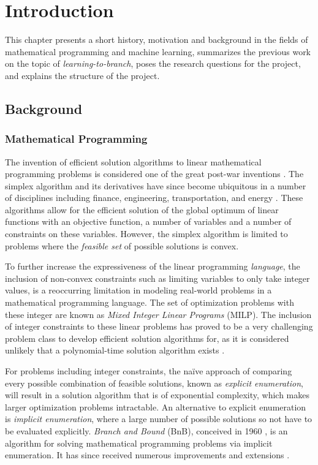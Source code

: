 \chapter{Introduction}\label{cha:introduction}
%
This chapter presents a short history, motivation and background in the fields of mathematical programming and machine learning, summarizes the previous work on the topic of \textit{learning-to-branch}, poses the research questions for the project, and explains the structure of the project.


\section{Background}


\subsection{Mathematical Programming}

The invention of efficient solution algorithms to linear mathematical programming problems is considered one of the great post-war inventions \cite{dantzig1983reminiscences}. The simplex algorithm and its derivatives have since become ubiquitous in a number of disciplines including finance, engineering, transportation, and energy \cite{junger2010years}. These algorithms allow for the efficient solution of the global optimum of linear functions with an objective function, a number of variables and a number of constraints on these variables. However, the simplex algorithm is limited to problems where the \textit{feasible set} of possible solutions is convex.

To further increase the expressiveness of the linear programming \textit{language}, the inclusion of non-convex constraints such as limiting variables to only take integer values, is a reoccurring limitation in modeling real-world problems in a mathematical programming language. The set of optimization problems with these integer are known as \textit{Mixed Integer Linear Programs} (\gls{MILP}). The inclusion of integer constraints to these linear problems has proved to be a very challenging problem class to develop efficient solution algorithms for, as it is considered unlikely that a polynomial-time solution algorithm exists \cite{bengio2020machine}.

For problems including integer constraints, the na\"ive approach of comparing every possible combination of feasible solutions, known as \textit{explicit enumeration}, will result in a solution algorithm that is of exponential complexity, which makes larger optimization problems intractable. An alternative to explicit enumeration is \textit{implicit enumeration}, where a large number of possible solutions so not have to be evaluated explicitly. 
\textit{Branch and Bound} (\gls{BnB}), conceived in 1960 \cite{land1960automatic}, is an algorithm for solving mathematical programming problems via implicit enumeration. It has since received numerous improvements and extensions \cite{wolsey2020integer}. 

